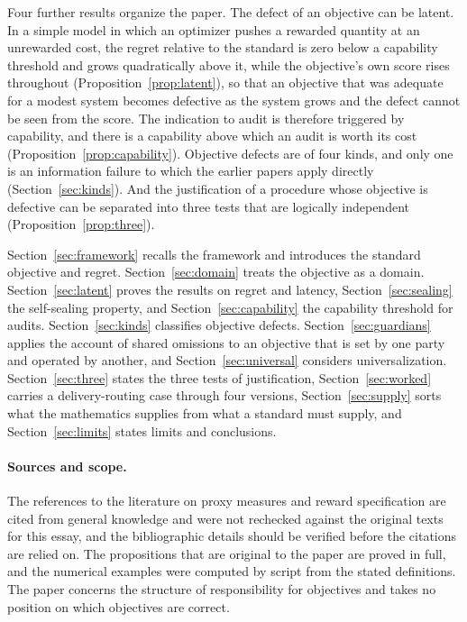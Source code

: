 \documentclass[11pt]{article}
\theoremstyle{plain}
\theoremstyle{definition}
\begin{document}
Four further results organize the paper. The defect of an objective can be latent. In a simple model in which an optimizer pushes a rewarded quantity at an unrewarded cost, the regret relative to the standard is zero below a capability threshold and grows quadratically above it, while the objective's own score rises throughout (Proposition~\ref{prop:latent}), so that an objective that was adequate for a modest system becomes defective as the system grows and the defect cannot be seen from the score. The indication to audit is therefore triggered by capability, and there is a capability above which an audit is worth its cost (Proposition~\ref{prop:capability}). Objective defects are of four kinds, and only one is an information failure to which the earlier papers apply directly (Section~\ref{sec:kinds}). And the justification of a procedure whose objective is defective can be separated into three tests that are logically independent (Proposition~\ref{prop:three}).

Section~\ref{sec:framework} recalls the framework and introduces the standard objective and regret. Section~\ref{sec:domain} treats the objective as a domain. Section~\ref{sec:latent} proves the results on regret and latency, Section~\ref{sec:sealing} the self-sealing property, and Section~\ref{sec:capability} the capability threshold for audits. Section~\ref{sec:kinds} classifies objective defects. Section~\ref{sec:guardians} applies the account of shared omissions to an objective that is set by one party and operated by another, and Section~\ref{sec:universal} considers universalization. Section~\ref{sec:three} states the three tests of justification, Section~\ref{sec:worked} carries a delivery-routing case through four versions, Section~\ref{sec:supply} sorts what the mathematics supplies from what a standard must supply, and Section~\ref{sec:limits} states limits and conclusions.

\paragraph{Sources and scope.} The references to the literature on proxy measures and reward specification are cited from general knowledge and were not rechecked against the original texts for this essay, and the bibliographic details should be verified before the citations are relied on. The propositions that are original to the paper are proved in full, and the numerical examples were computed by script from the stated definitions. The paper concerns the structure of responsibility for objectives and takes no position on which objectives are correct.
\end{document}
